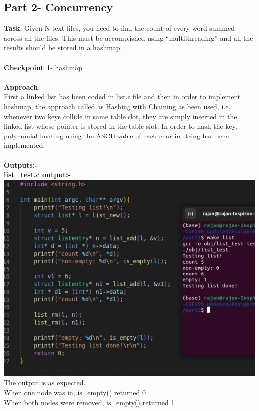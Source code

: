 \documentclass[12pt]{article}
\begin{document}
\begin{spacing}{1.2}
    \newpage

\section*{Part 2- Concurrency}

\textbf{Task}: Given N text files, you need to find the count of every word summed across all the files. This must be accomplished using “multithreading” and all the results should be stored in a hashmap.\\
\\
\textbf{Checkpoint 1}- hashmap\\
\\
\textbf{Approach}:- \\
First a linked list has been coded in list.c file and then in order to implement hashmap, the approach called as Hashing with Chaining as been used, i.e. whenever two keys collide in same table slot, they are simply inserted in the linked list whose pointer is stored in the table slot. 
In order to hash the key, polynomial hashing using the ASCII value of each char in string has been implemented.\\
\\
\textbf{Outputs:-}\\
\textbf{list\_test.c output:-}\\
\includegraphics[width=16cm]{images/7.jpg}\\
The output is as expected.\\
When one node was in, is\_empty() returned 0\\
When both nodes were removed, is\_empty() returned 1\\


\end{spacing}
\end{document}
